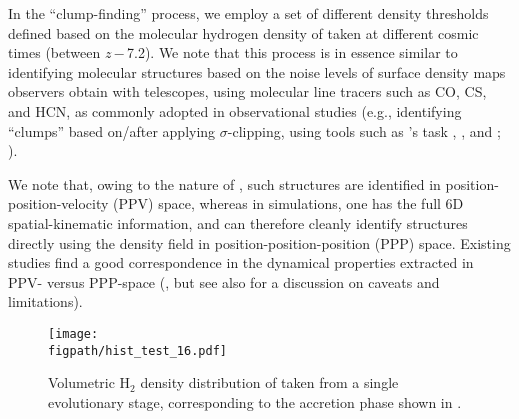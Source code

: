 \IfFileExists{emulateapjlegacy.cls}{\documentclass[iop]{emulateapjlegacy}}{\documentclass[iop]{emulateapj}}
\def\figpath{./Fig}
\begin{document}
In the ``clump-finding'' process, we employ a set of different density thresholds defined based on the molecular hydrogen density of \flower taken at different cosmic times (between $z$\,$-$\,7.2). We note that this process is in essence similar to identifying molecular structures based on the noise levels of surface density maps observers obtain with telescopes, using molecular line tracers such as CO, CS, and HCN, as commonly adopted in observational studies (e.g., identifying ``clumps'' based on/after applying $\sigma$-clipping, using tools such as 's task , , and ; \citealt{Williams94a, Oka01a, Rosolowsky06a, Rosolowsky08a}).

We note that, owing to the nature of \obs, such structures are identified in position-position-velocity (PPV) space, whereas in simulations, one has the full 6D spatial-kinematic information, and can therefore cleanly identify structures directly using the density field in position-position-position (PPP) space.
Existing studies find a good correspondence in the dynamical properties extracted in PPV- versus PPP-space (\citealt{Ballesteros-Paredes02a, Heitsch09a, Shetty10a, Beaumont13a, Pan15a}, but see also \citealt{Shetty10a} for a discussion on caveats and limitations).

\begin{figure}[htbp]
\centering
\texttt{[image: \\figpath/hist\_test\_16.pdf]}
\caption{
Volumetric H$_2$ density distribution of \flower taken from a single evolutionary stage, corresponding to the accretion phase shown in .
\label{fig:h2density}}
\end{figure}
\end{document}
